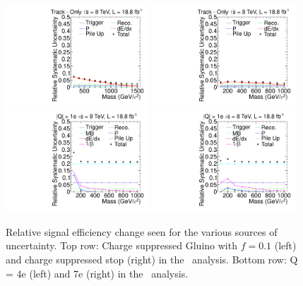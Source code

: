 \begin{figure}[ht]
\centering
  \includegraphics[clip=false, trim=0.0cm 0cm 0.0cm 0cm, width=0.48\textwidth]{figures/tkonly/TkGluinoN_f10Uncertainty}
  \includegraphics[clip=false, trim=0.0cm 0cm 0.0cm 0cm, width=0.48\textwidth]{figures/tkonly/TkStopNUncertainty}\\
  \includegraphics[clip=false, trim=0.0cm 0cm 0.0cm 0cm, width=0.48\textwidth]{figures/multi/HQDY_Q4Uncertainty}
  \includegraphics[clip=false, trim=0.0cm 0cm 0.0cm 0cm, width=0.48\textwidth]{figures/multi/HQDY_Q7Uncertainty}\\
\caption[Relative signal efficiency change seen for the various sources of uncertainty for some of the models considered in the \tkonly\ and \tktof\ analyses]
{Relative signal efficiency change seen for the various sources of uncertainty.
Top row: Charge suppressed Gluino with $f=0.1$ (left) and charge suppressed stop (right) in the \tkonly\ analysis.
Bottom row: Q = 4e (left) and 7e (right) in the \multi\ analysis.}
    \label{fig:TkOnMCUncSource}
\end{figure}

